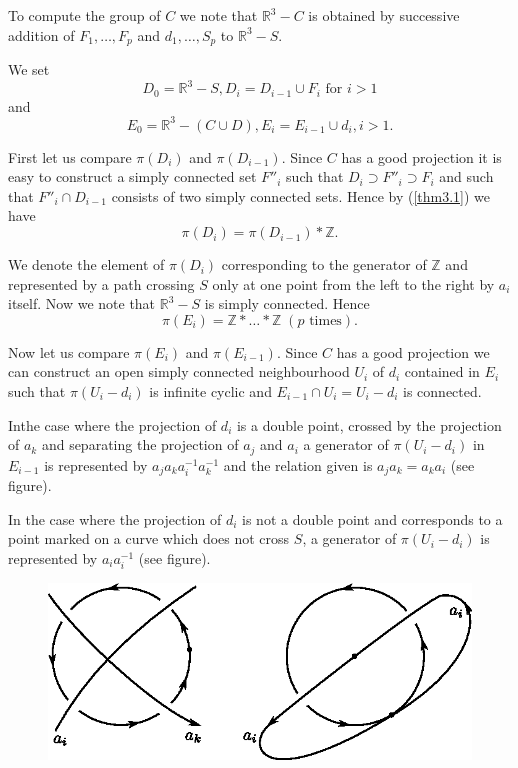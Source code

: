 To compute the group of $C$ we note that $\mathbb{R}^3 -C$ is obtained by
successive addition of $F_1, \ldots, F_p$ and $d_1, \ldots, S_p$ to
$\mathbb{R}^3 -S$.  

\indent
We set\pageoriginale
$$
D_0 = \mathbb{R}^3 - S, D_i = D_{i -1} \cup F_i \text{ for } i > 1 
$$
and 
$$
E_0 = \mathbb{R}^3- (C \cup D), E_i = E_{i -1} \cup d_i, i>1.  
$$

First let us compare $\pi(D_i)$ and $\pi(D_{i-1})$. Since $C$ has
a good projection it is easy to construct a simply connected set
$F''_i$ such that $D_i \supset F''_i \supset F_i$ and such that $F''_i
\cap D_{i-1}$ consists of two simply connected sets. Hence by (\ref{thm3.1})
we have 
$$
\pi (D_i) = \pi (D_{i-1}) \ast \mathbb{Z}.
$$

We denote the element of $\pi(D_i)$ corresponding to the generator
of $\mathbb{Z}$ and represented by a path crossing $S$ only at one
point from the left to the right by $a_i$ itself. Now we note that
$\mathbb{R}^3 -S$ is simply connected. Hence  
$$
\pi (E_i) = \mathbb{Z} \ast \ldots \ast \mathbb{Z} \; (p \text{ times}). 
$$

Now let us compare $\pi (E_i)$ and $\pi (E_{i-1})$. Since $C$ has a
good projection we can construct an open simply connected
neighbourhood $U_i$ of $d_i$ contained in $E_i$ such that $\pi (U_i -
d_i)$ is infinite cyclic and $E_{i-1} \cap U_i = U_i - d_i$ is
connected. 

In\pageoriginale the case where the projection of $d_i$ is a double
point, crossed by the projection of $a_k$ and separating the
projection of $a_j$ and $a_i$ a generator of $\pi(U_i - d_i)$ in
$E_{i -1}$ is represented by $a_j a_k a^{-1}_i a^{-1}_k$ and the
relation given is $a_j a_k = a_k a_i$ (see figure).  

In the case where the projection of $d_i$ is not a double point and
corresponds to a point marked on a curve which does not cross $S$, a
generator of $\pi (U_i - d_i)$ is represented by $a_i a^{-1}_i$ (see
figure). 

\begin{figure}[H]
\centering
\includegraphics{vol44-fig/fig44-7.eps}
\end{figure}

